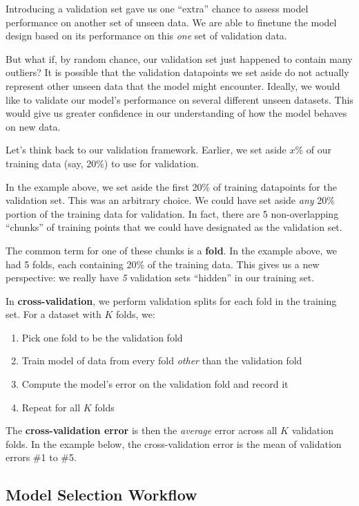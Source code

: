\documentclass[
  letterpaper,
  DIV=11,
  numbers=noendperiod]{scrreprt}
\providecommand{\tightlist}{%
  \setlength{\itemsep}{0pt}\setlength{\parskip}{0pt}}\usepackage{longtable,booktabs,array}
\begin{document}
Introducing a validation set gave us one ``extra'' chance to assess
model performance on another set of unseen data. We are able to finetune
the model design based on its performance on this \emph{one} set of
validation data.

But what if, by random chance, our validation set just happened to
contain many outliers? It is possible that the validation datapoints we
set aside do not actually represent other unseen data that the model
might encounter. Ideally, we would like to validate our model's
performance on several different unseen datasets. This would give us
greater confidence in our understanding of how the model behaves on new
data.

Let's think back to our validation framework. Earlier, we set aside
\(x\)\% of our training data (say, 20\%) to use for validation.

In the example above, we set aside the first 20\% of training datapoints
for the validation set. This was an arbitrary choice. We could have set
aside \emph{any} 20\% portion of the training data for validation. In
fact, there are 5 non-overlapping ``chunks'' of training points that we
could have designated as the validation set.

The common term for one of these chunks is a \textbf{fold}. In the
example above, we had 5 folds, each containing 20\% of the training
data. This gives us a new perspective: we really have \emph{5}
validation sets ``hidden'' in our training set.

In \textbf{cross-validation}, we perform validation splits for each fold
in the training set. For a dataset with \(K\) folds, we:

\begin{enumerate}
\def\labelenumi{\arabic{enumi}.}
\tightlist
\item
  Pick one fold to be the validation fold
\item
  Train model of data from every fold \emph{other} than the validation
  fold
\item
  Compute the model's error on the validation fold and record it
\item
  Repeat for all \(K\) folds
\end{enumerate}

The \textbf{cross-validation error} is then the \emph{average} error
across all \(K\) validation folds. In the example below, the
cross-validation error is the mean of validation errors \#1 to \#5.

\subsection{Model Selection Workflow}\label{model-selection-workflow}
\end{document}
